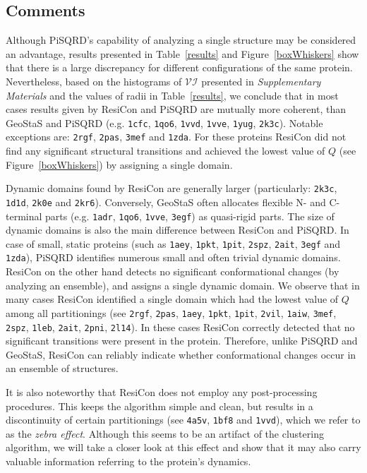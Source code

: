 \documentclass[a4paper,11pt,twoside]{book}%
\begin{document}
\subsection*{Comments}
Although PiSQRD's capability of analyzing a single structure may be considered an advantage, results presented in Table~\ref{results} and Figure~\ref{boxWhiskers} show that there is a large discrepancy for different configurations of the same protein.
Nevertheless, based on the histograms of $\mathcal{VI}$ presented in \emph{Supplementary Materials} and the values of radii in Table~\ref{results}, we conclude that in most cases results given by ResiCon and PiSQRD are mutually more coherent, than GeoStaS and PiSQRD (e.g. \texttt{1cfc}, \texttt{1qo6}, \texttt{1vvd}, \texttt{1vve}, \texttt{1yug}, \texttt{2k3c}).
Notable exceptions are: \texttt{2rgf}, \texttt{2pas}, \texttt{3mef} and \texttt{1zda}. 
For these proteins ResiCon did not find any significant structural transitions and achieved the lowest value of $Q$ (see Figure~\ref{boxWhiskers}) by assigning a single domain.

Dynamic domains found by ResiCon are generally larger (particularly: \texttt{2k3c}, \texttt{1d1d}, \texttt{2k0e} and \texttt{2kr6}).
Conversely, GeoStaS often allocates flexible N- and C-terminal parts (e.g. \texttt{1adr}, \texttt{1qo6}, \texttt{1vve}, \texttt{3egf}) as quasi-rigid parts.
The size of dynamic domains is also the main difference between ResiCon and PiSQRD.
In case of small, static proteins (such as \texttt{1aey}, \texttt{1pkt}, \texttt{1pit}, \texttt{2spz}, \texttt{2ait}, \texttt{3egf} and \texttt{1zda}), PiSQRD identifies numerous small and often trivial dynamic domains. 
ResiCon on the other hand detects no significant conformational changes (by analyzing an ensemble), and assigns a single dynamic domain.
We observe that in many cases ResiCon identified a single domain which had the lowest value of $Q$ among all partitionings (see \texttt{2rgf}, \texttt{2pas}, \texttt{1aey}, \texttt{1pkt}, \texttt{1pit}, \texttt{2vil}, \texttt{1aiw}, \texttt{3mef}, \texttt{2spz}, \texttt{1leb}, \texttt{2ait}, \texttt{2pni}, \texttt{2l14}).
In these cases ResiCon correctly detected that no significant transitions were present in the protein.
Therefore, unlike PiSQRD and GeoStaS, ResiCon can reliably indicate whether conformational changes occur in an ensemble of structures.

It is also noteworthy that ResiCon does not employ any post-processing procedures.
This keeps the algorithm simple and clean, but results in a discontinuity of certain partitionings (see \texttt{4a5v}, \texttt{1bf8} and \texttt{1vvd}), which we refer to as the \emph{zebra effect}.
Although this seems to be an artifact of the clustering algorithm, we will take a closer look at this effect and show that it may also carry valuable information referring to the protein's dynamics.
\end{document}
